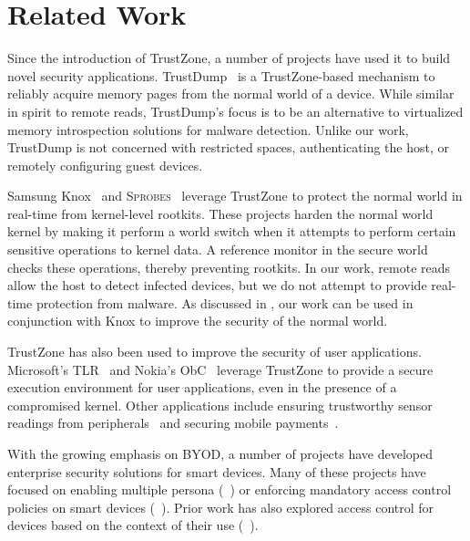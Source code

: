\section{Related Work}
\label{section:related}

%
Since the introduction of TrustZone, a number of projects have used it to build
novel security applications.  TrustDump~\cite{trustdump:esorics14} is a
TrustZone-based mechanism to reliably acquire memory pages from the normal
world of a device.  While similar in spirit to remote reads, TrustDump's focus
is to be an alternative to virtualized memory introspection solutions for
malware detection. Unlike our work, TrustDump is not concerned with restricted
spaces, authenticating the host, or remotely configuring guest devices.

Samsung Knox~\cite{knox:ccs14} and \textsc{Sprobes}~\cite{sprobes:most14}
leverage TrustZone to protect the normal world in real-time from kernel-level
rootkits. These projects harden the normal world kernel by making it perform a
world switch when it attempts to perform certain sensitive operations to kernel
data. A reference monitor in the secure world checks these operations, thereby
preventing rootkits. In our work, remote reads allow the host to detect
infected devices, but we do not attempt to provide real-time protection from
malware. As discussed in , our work can be used in
conjunction with Knox to improve the security of the normal world.

TrustZone has also been used to improve the security of user applications.
Microsoft's TLR~\cite{tlr:asplos14} and Nokia's ObC~\cite{obc:asiaccs09}
leverage TrustZone to provide a secure execution environment for user
applications, even in the presence of a compromised kernel. Other applications
include ensuring trustworthy sensor readings from
peripherals~\cite{tenor:mobisys12} and securing mobile payments~\cite{proxama}.

 With the growing emphasis on BYOD, a number
of projects have developed enterprise security solutions for smart devices.
Many of these projects have focused on enabling multiple persona
(\eg~\cite{asm:sec14,flaskdroid:sec13,cells:sosp11}) or enforcing mandatory
access control policies on smart devices
(\eg~\cite{deepdroid:ndss15,seandroid:ndss13,flaskdroid:sec13,asm:sec14}).
Prior work has also explored access control for devices based on the context of
their use
(\eg~\cite{crepe:isc10,conucon:securecomm10,saint:acsac09,Covington2002,Damiani2007,conxsense:asiaccs14}).

